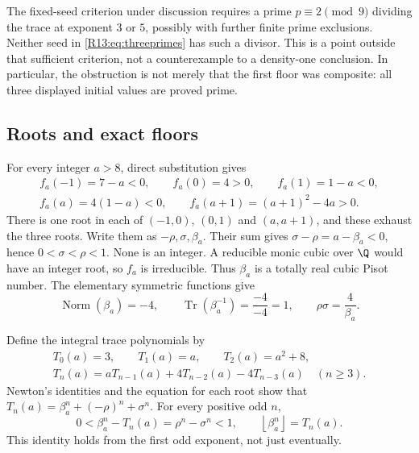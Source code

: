 \documentclass[11pt,a4paper]{article}
\theoremstyle{definition}\newtheorem{definition}[theorem]{Definition}
\theoremstyle{remark}\newtheorem{remark}[theorem]{Remark}
\newcommand{\floor}[1]{\left\lfloor#1\right\rfloor}
\DeclareMathOperator{\Tr}{Tr}\DeclareMathOperator{\tr}{tr}\DeclareMathOperator{\Nm}{N}
\DeclareMathOperator{\Norm}{Norm}\DeclareMathOperator{\ord}{ord}\DeclareMathOperator{\Gal}{Gal}
\begin{document}
The fixed-seed criterion under discussion requires a prime
$p\equiv2\pmod9$ dividing the trace at exponent $3$ or $5$,
possibly with further finite prime exclusions.
Neither seed in \eqref{R13:eq:threeprimes} has such a divisor.
This is a point outside that sufficient criterion, not a counterexample
to a density-one conclusion.
In particular, the obstruction is not merely that the first floor
was composite: all three displayed initial values are proved prime.

\subsection{Roots and exact floors}

For every integer $a>8$, direct substitution gives
\[
 \begin{gathered}
 f_a(-1)=7-a<0,\qquad f_a(0)=4>0,\qquad f_a(1)=1-a<0,\\
 f_a(a)=4(1-a)<0,\qquad f_a(a+1)=(a+1)^2-4a>0.
 \end{gathered}
\]
There is one root in each of $(-1,0)$, $(0,1)$ and $(a,a+1)$,
and these exhaust the three roots. Write them as $-\rho,\sigma,\beta_a$.
Their sum gives $\sigma-\rho=a-\beta_a<0$, hence
$0<\sigma<\rho<1$.
None is an integer. A reducible monic cubic over $\Q$ would have an
integer root, so $f_a$ is irreducible.
Thus $\beta_a$ is a totally real cubic Pisot number.
The elementary symmetric functions give
\begin{equation}\label{R13:eq:norm}
 \Norm(\beta_a)=-4,\qquad
 \Tr(\beta_a^{-1})=\frac{-4}{-4}=1,\qquad
 \rho\sigma=\frac4{\beta_a}.
\end{equation}

Define the integral trace polynomials by
\begin{equation}\label{R13:eq:recurrence}
 \begin{gathered}
 T_0(a)=3,\qquad T_1(a)=a,\qquad T_2(a)=a^2+8,\\
 T_n(a)=aT_{n-1}(a)+4T_{n-2}(a)-4T_{n-3}(a)\quad(n\ge3).
 \end{gathered}
\end{equation}
Newton's identities and the equation for each root show that
$T_n(a)=\beta_a^n+(-\rho)^n+\sigma^n$.
For every positive odd $n$,
\begin{equation}\label{R13:eq:floor}
 0<\beta_a^n-T_n(a)=\rho^n-\sigma^n<1,
 \qquad \floor{\beta_a^n}=T_n(a).
\end{equation}
This identity holds from the first odd exponent, not just eventually.
\end{document}
